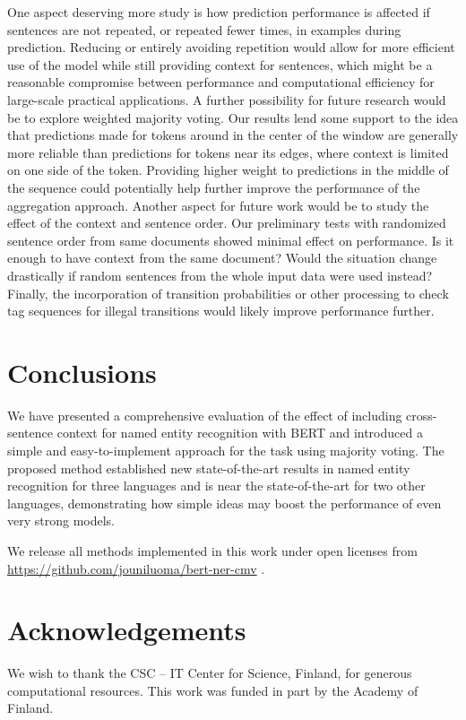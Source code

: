 One aspect deserving more study is how prediction performance is affected if sentences are not repeated, or repeated fewer times, in examples during prediction. Reducing or entirely avoiding repetition would allow for more efficient use of the model while still providing context for sentences, which might be a reasonable compromise between performance and computational efficiency for large-scale practical applications.
A further possibility for future research would be to explore weighted majority voting. Our results lend some support to the idea that predictions made for tokens around in the center of the window are generally more reliable than predictions for tokens near its edges, where context is limited on one side of the token. Providing higher weight to predictions in the middle of the sequence could potentially help further improve the performance of the aggregation approach. Another aspect for future work would be to study the effect of the context and sentence order. Our preliminary tests with randomized sentence order from same documents showed minimal effect on performance. Is it enough to have context from the same document? Would the situation change drastically if random sentences from the whole input data were used instead? Finally, the incorporation of transition probabilities or other processing to check tag sequences for illegal transitions would likely improve performance further.

\section{Conclusions}

We have presented a comprehensive evaluation of the effect of including cross-sentence context for named entity recognition with BERT and introduced a simple and easy-to-implement approach for the task using majority voting. The proposed method established new state-of-the-art results in named entity recognition for three languages and is near the state-of-the-art for two other languages, demonstrating how simple ideas may boost the performance of even very strong models.

We release all methods implemented in this work under open licenses from \url{https://github.com/jouniluoma/bert-ner-cmv} .

\section*{Acknowledgements}

We wish to thank the CSC -- IT Center for Science, Finland, for generous computational resources. This work was funded in part by the Academy of Finland.

